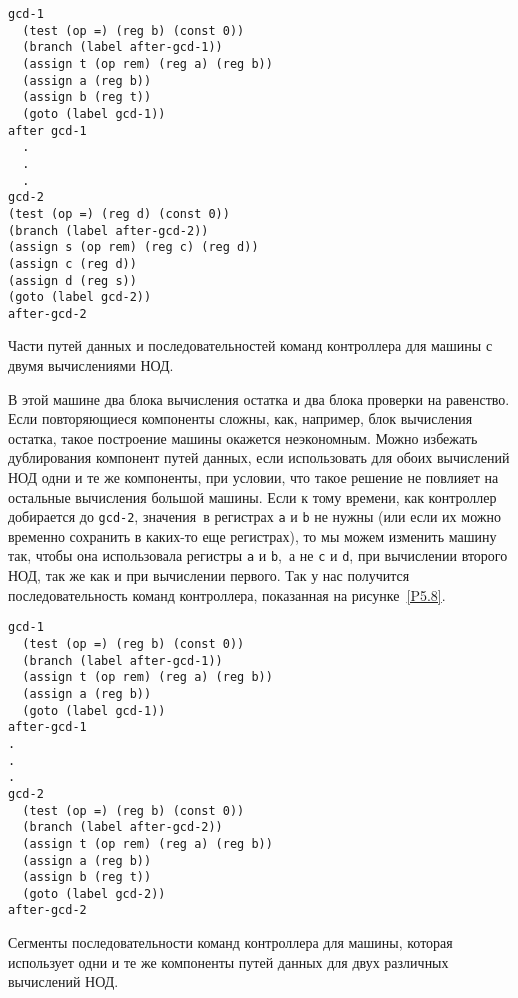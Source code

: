 \begin{cntrfig}

\begin{Verbatim}[fontsize=\small]
gcd-1
  (test (op =) (reg b) (const 0))
  (branch (label after-gcd-1))
  (assign t (op rem) (reg a) (reg b))
  (assign a (reg b))
  (assign b (reg t))
  (goto (label gcd-1))
after gcd-1
  .
  .
  .
gcd-2
(test (op =) (reg d) (const 0))
(branch (label after-gcd-2))
(assign s (op rem) (reg c) (reg d))
(assign c (reg d))
(assign d (reg s))
(goto (label gcd-2))
after-gcd-2
\end{Verbatim}
\caption{Части путей данных и последовательностей
команд контроллера для машины с двумя вычислениями НОД.}
\label{P5.7}

\end{cntrfig}

В этой машине два блока вычисления остатка и два блока
проверки на равенство.  Если повторяющиеся компоненты сложны, как,
например, блок вычисления остатка, такое построение машины окажется
неэкономным.  Можно избежать дублирования компонент путей данных, если
использовать для обоих вычислений НОД одни и те же компоненты, при
условии, что такое решение не повлияет на остальные вычисления большой
машины.  Если к тому времени, как контроллер добирается до
{\tt gcd-2}, значения~в регистрах {\tt a} и
{\tt b} не нужны (или если их можно временно сохранить в
каких-то еще регистрах), то мы можем изменить машину так, чтобы она
использовала регистры {\tt a} и {\tt b},~а не
{\tt c} и {\tt d}, при вычислении второго НОД, так же
как и при вычислении первого.  Так у нас получится
последовательность команд контроллера, показанная на 
рисунке~\ref{P5.8}.


\begin{cntrfig}
\begin{Verbatim}[fontsize=\small]
gcd-1
  (test (op =) (reg b) (const 0))
  (branch (label after-gcd-1))
  (assign t (op rem) (reg a) (reg b))
  (assign a (reg b))
  (goto (label gcd-1))
after-gcd-1
.
.
.
gcd-2
  (test (op =) (reg b) (const 0))
  (branch (label after-gcd-2))
  (assign t (op rem) (reg a) (reg b))
  (assign a (reg b))
  (assign b (reg t))
  (goto (label gcd-2))
after-gcd-2  
\end{Verbatim}
\caption{Сегменты последовательности команд
контроллера для машины, которая использует одни и те же компоненты
путей данных для двух различных вычислений НОД.}
\label{P5.8}

\end{cntrfig}

